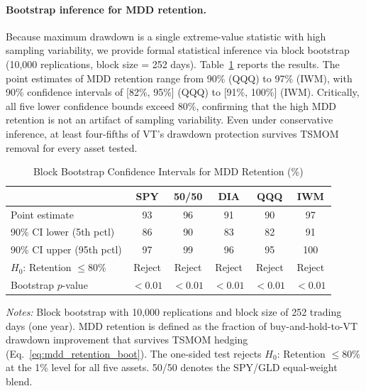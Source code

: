 \paragraph{Bootstrap inference for MDD retention.} Because maximum drawdown is a single extreme-value statistic with high sampling variability, we provide formal statistical inference via block bootstrap (10,000 replications, block size = 252 days). Table~\ref{tab:mdd_bootstrap} reports the results. The point estimates of MDD retention range from 90\% (QQQ) to 97\% (IWM), with 90\% confidence intervals of [82\%, 95\%] (QQQ) to [91\%, 100\%] (IWM). Critically, all five lower confidence bounds exceed 80\%, confirming that the high MDD retention is not an artifact of sampling variability. Even under conservative inference, at least four-fifths of VT's drawdown protection survives TSMOM removal for every asset tested.

\begin{table}[H]
\centering
\begin{threeparttable}
\caption{Block Bootstrap Confidence Intervals for MDD Retention (\%)}
\label{tab:mdd_bootstrap}
\small
\begin{tabular}{@{}lccccc@{}}
\toprule
& SPY & 50/50 & DIA & QQQ & IWM \\
\midrule
Point estimate & 93 & 96 & 91 & 90 & 97 \\
90\% CI lower (5th pctl) & 86 & 90 & 83 & 82 & 91 \\
90\% CI upper (95th pctl) & 97 & 99 & 96 & 95 & 100 \\
\midrule
$H_0$: Retention $\leq 80\%$ & Reject & Reject & Reject & Reject & Reject \\
Bootstrap $p$-value & $< 0.01$ & $< 0.01$ & $< 0.01$ & $< 0.01$ & $< 0.01$ \\
\bottomrule
\end{tabular}
\begin{tablenotes}
\small
\item \textit{Notes:} Block bootstrap with 10,000 replications and block size of 252 trading days (one year). MDD retention is defined as the fraction of buy-and-hold-to-VT drawdown improvement that survives TSMOM hedging (Eq.~\ref{eq:mdd_retention_boot}). The one-sided test rejects $H_0$: Retention $\leq 80\%$ at the 1\% level for all five assets. 50/50 denotes the SPY/GLD equal-weight blend.
\end{tablenotes}
\end{threeparttable}
\end{table}

